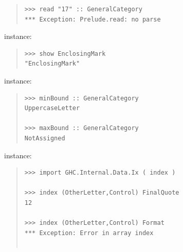 \begin{haddockdesc}
{\begin{quote}
{\begin{verbatim}
>>> read "17" :: GeneralCategory
*** Exception: Prelude.read: no parse

\end{verbatim}}
\end{quote}
 instance:\par
\begin{quote}
{\haddockverb\begin{verbatim}
>>> show EnclosingMark
"EnclosingMark"

\end{verbatim}}
\end{quote}
 instance:\par
\begin{quote}
{\haddockverb\begin{verbatim}
>>> minBound :: GeneralCategory
UppercaseLetter

>>> maxBound :: GeneralCategory
NotAssigned

\end{verbatim}}
\end{quote}
 instance:\par
\begin{quote}
{\haddockverb\begin{verbatim}
>>> import GHC.Internal.Data.Ix ( index )

>>> index (OtherLetter,Control) FinalQuote
12

>>> index (OtherLetter,Control) Format
*** Exception: Error in array index


\end{verbatim}}
\end{quote}}
\end{haddockdesc}
